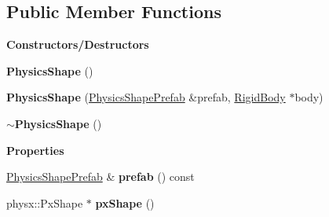 \subsection*{Public Member Functions}
\begin{Indent}\textbf{ Constructors/\+Destructors}\par
\begin{DoxyCompactItemize}
\item 
\mbox{\label{classrev_1_1_physics_shape_ab2c024ea298e1aa1b862b12db1681e7f}} 
{\bfseries Physics\+Shape} ()
\item 
\mbox{\label{classrev_1_1_physics_shape_abfe2831e80060ace27100181bf9f662c}} 
{\bfseries Physics\+Shape} (\mbox{\hyperlink{classrev_1_1_physics_shape_prefab}{Physics\+Shape\+Prefab}} \&prefab, \mbox{\hyperlink{classrev_1_1_rigid_body}{Rigid\+Body}} $\ast$body)
\item 
\mbox{\label{classrev_1_1_physics_shape_af4852971fdd7242f669efcae67c87767}} 
{\bfseries $\sim$\+Physics\+Shape} ()
\end{DoxyCompactItemize}
\end{Indent}
\begin{Indent}\textbf{ Properties}\par
\begin{DoxyCompactItemize}
\item 
\mbox{\label{classrev_1_1_physics_shape_a5be161e41130028fc048ce5855ea1d70}} 
\mbox{\hyperlink{classrev_1_1_physics_shape_prefab}{Physics\+Shape\+Prefab}} \& {\bfseries prefab} () const
\item 
\mbox{\label{classrev_1_1_physics_shape_a1335bd466b4c05d9204d67c506400f32}} 
physx\+::\+Px\+Shape $\ast$ {\bfseries px\+Shape} ()
\end{DoxyCompactItemize}
\end{Indent}
